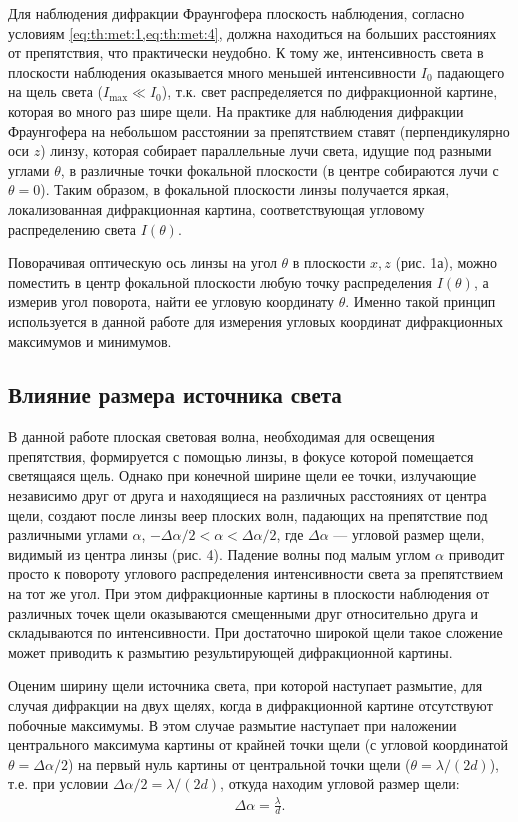 Для наблюдения дифракции Фраунгофера плоскость наблюдения, согласно условиям \cref{eq:th:met:1,eq:th:met:4}, должна находиться на больших расстояниях от препятствия, что практически неудобно. К тому же, интенсивность света в плоскости наблюдения оказывается много меньшей интенсивности $I_0$ падающего на щель света ($I_{\text{max}} \ll I_0$), т.к. свет распределяется по дифракционной картине, которая во много раз шире щели. На практике для наблюдения дифракции Фраунгофера на небольшом расстоянии за препятствием ставят (перпендикулярно оси $z$) линзу, которая собирает параллельные лучи света, идущие под разными углами $\theta$, в различные точки фокальной плоскости (в центре собираются лучи с $\theta = 0$). Таким образом, в фокальной плоскости линзы получается яркая, локализованная дифракционная картина, соответствующая угловому распределению света $I(\theta)$.

Поворачивая оптическую ось линзы на угол $\theta$ в плоскости $x, z$ (рис. 1а), можно поместить в центр фокальной плоскости любую точку распределения $I(\theta)$, а измерив угол поворота, найти ее угловую координату $\theta$. Именно такой принцип используется в данной работе для измерения угловых координат дифракционных максимумов и минимумов.

\subsection{Влияние размера источника света}

В данной работе плоская световая волна, необходимая для освещения препятствия, формируется с помощью линзы, в фокусе которой помещается светящаяся щель. Однако при конечной ширине щели ее точки, излучающие независимо друг от друга и находящиеся на различных расстояниях от центра щели, создают после линзы веер плоских волн, падающих на препятствие под различными углами $\alpha$, $-\Delta\alpha/2 < \alpha < \Delta\alpha/2$, где $\Delta\alpha$ — угловой размер щели, видимый из центра линзы (рис. 4). Падение волны под малым углом $\alpha$ приводит просто к повороту углового распределения интенсивности света за препятствием на тот же угол. При этом дифракционные картины в плоскости наблюдения от различных точек щели оказываются смещенными друг относительно друга и складываются по интенсивности. При достаточно широкой щели такое сложение может приводить к размытию результирующей дифракционной картины.

Оценим ширину щели источника света, при которой наступает размытие, для случая дифракции на двух щелях, когда в дифракционной картине отсутствуют побочные максимумы. В этом случае размытие наступает при наложении центрального максимума картины от крайней точки щели (с угловой координатой $\theta = \Delta\alpha/2$) на первый нуль картины от центральной точки щели ($\theta = \lambda/(2d)$), т.е. при условии $\Delta\alpha/2 = \lambda/(2d)$, откуда находим угловой размер щели:
\begin{align} \label{eq:th:met:6}
	\Delta\alpha = \frac{\lambda}{d}.
\end{align}

